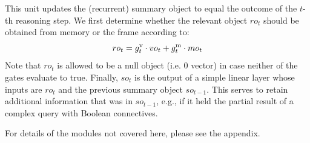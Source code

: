 This unit updates the (recurrent) summary object to equal the outcome of the $t$-th reasoning step.
We first determine whether the relevant object $ro_t$ should be obtained from memory or the frame according to:
\[ ro_t = g^{\mathrm{v}}_t \cdot vo_t + g^{\mathrm{m}}_t \cdot mo_t \]
Note that $ro_t$ is allowed to be a null object (i.e. 0 vector) in case neither of the gates evaluate to true.
Finally, $so_t$ is the output of a simple linear layer whose inputs are $ro_t$ and the previous summary object $so_{t-1}$.
This serves to retain additional information that was in $so_{t-1}$, e.g., if it held the partial result of a complex query with Boolean connectives.

For details of the modules not covered here, please see the appendix.